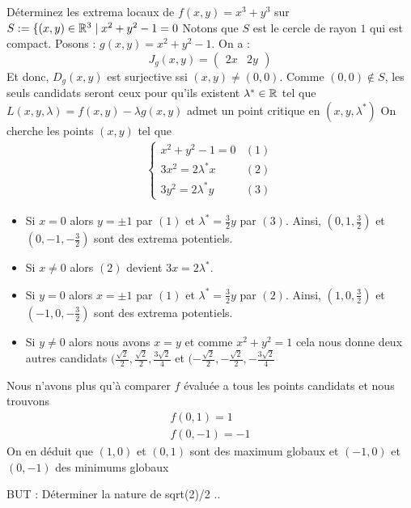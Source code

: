 \begin{exemple}
    Déterminez les extrema locaux de $f(x,y) = x^3+ y^3$ sur $S:=\{(x,y)\in\mathbb{R}^3\mid x^2 + y^2 - 1 = 0$
    Notons que $S$ est le cercle de rayon $1$ qui est compact. 
    Posons : $g(x,y) = x^2 + y^2 -1$.
    On a :
    $$J_g(x,y) = \begin{pmatrix}
        2x & 2y
    \end{pmatrix}$$
    Et donc, $D_g(x,y)$ est surjective ssi $(x,y) \ne (0,0)$.
    Comme $(0,0) \notin S$, les seuls candidats seront ceux pour qu'ils existent 
    $\lambda^* \in \mathbb{R}$ tel que $L(x,y,\lambda) = f(x,y) - \lambda g(x,y)$
    admet un point critique en $(x,y,\lambda^*)$
    On cherche les points $(x,y)$ tel que 
    \begin{align*}
        \begin{cases}
            x^2 + y^2 - 1 = 0  & (1)\\
            3x^2 = 2\lambda^*x& (2)\\
            3y^2 = 2\lambda^*y&(3)
        \end{cases}
    \end{align*}
    \begin{itemize}
        \item Si $x = 0$ alors $y = \pm 1$ par $(1)$ et $\lambda^* = \frac{3}{2}y$ par $(3)$. Ainsi, $(0,1,\frac{3}{2})$ et $ (0,-1,-\frac{3}{2})$ sont des extrema potentiels.
        \item Si $x\ne 0$ alors $(2)$ devient $3x = 2\lambda^*$. 
        \item Si $y = 0$ alors $x = \pm 1$ par $(1)$ et $\lambda^* = \frac32y$ par $(2)$.  Ainsi, $(1,0,\frac{3}{2})$ et $ (-1,0,-\frac{3}{2})$ sont des extrema potentiels.
        \item Si $y\ne0$ alors nous avons $x = y$ et comme $x^2 + y^2 = 1$ cela nous donne deux autres candidats $(\frac{\sqrt2}{2},\frac{\sqrt2}{2},\frac{3\sqrt2}{4}$ et 
        $(-\frac{\sqrt2}{2},-\frac{\sqrt2}{2},-\frac{3\sqrt2}{4}$
        
    \end{itemize}
    Nous n'avons plus qu'à comparer $f$ évaluée a tous les points candidats et nous trouvons 
    \begin{align*}
        f(0,1) = 1 \\
        f(0,-1)=-1 
    \end{align*}
    On en déduit que $(1,0) $ et $(0,1)$ sont des maximum globaux et 
    $(-1,0)$ et $(0,-1)$ des minimums globaux

    BUT : Déterminer la nature de sqrt(2)/2 .. 
\end{exemple}


